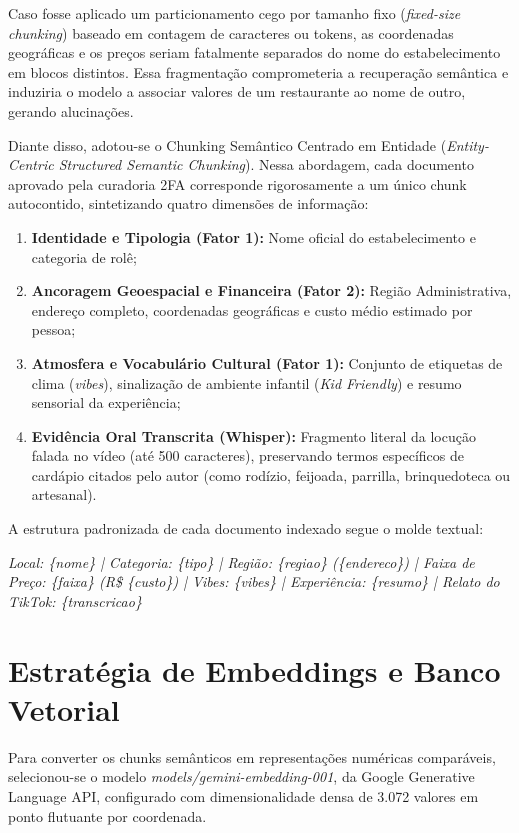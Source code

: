 \documentclass[12pt,a4paper]{article}
\begin{document}
Caso fosse aplicado um particionamento cego por tamanho fixo (\textit{fixed-size chunking}) baseado em contagem de caracteres ou tokens, as coordenadas geográficas e os preços seriam fatalmente separados do nome do estabelecimento em blocos distintos. Essa fragmentação comprometeria a recuperação semântica e induziria o modelo a associar valores de um restaurante ao nome de outro, gerando alucinações.

Diante disso, adotou-se o Chunking Semântico Centrado em Entidade (\textit{Entity-Centric Structured Semantic Chunking}). Nessa abordagem, cada documento aprovado pela curadoria 2FA corresponde rigorosamente a um único chunk autocontido, sintetizando quatro dimensões de informação:

\begin{enumerate}
\item \textbf{Identidade e Tipologia (Fator 1):} Nome oficial do estabelecimento e categoria de rolê;
\item \textbf{Ancoragem Geoespacial e Financeira (Fator 2):} Região Administrativa, endereço completo, coordenadas geográficas e custo médio estimado por pessoa;
\item \textbf{Atmosfera e Vocabulário Cultural (Fator 1):} Conjunto de etiquetas de clima (\textit{vibes}), sinalização de ambiente infantil (\textit{Kid Friendly}) e resumo sensorial da experiência;
\item \textbf{Evidência Oral Transcrita (Whisper):} Fragmento literal da locução falada no vídeo (até 500 caracteres), preservando termos específicos de cardápio citados pelo autor (como rodízio, feijoada, parrilla, brinquedoteca ou artesanal).
\end{enumerate}

A estrutura padronizada de cada documento indexado segue o molde textual:
\begin{center}
\textit{Local: \{nome\} | Categoria: \{tipo\} | Região: \{regiao\} (\{endereco\}) | Faixa de Preço: \{faixa\} (R\$ \{custo\}) | Vibes: \{vibes\} | Experiência: \{resumo\} | Relato do TikTok: \{transcricao\}}
\end{center}

\section{Estratégia de Embeddings e Banco Vetorial}

Para converter os chunks semânticos em representações numéricas comparáveis, selecionou-se o modelo \textit{models/gemini-embedding-001}, da Google Generative Language API, configurado com dimensionalidade densa de 3.072 valores em ponto flutuante por coordenada.
\end{document}
